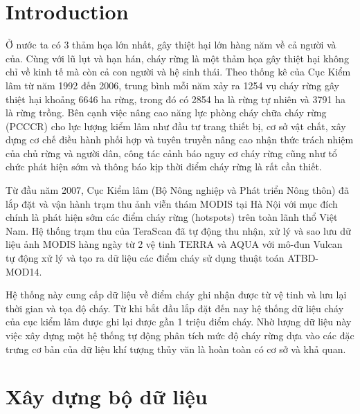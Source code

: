 \documentclass{article}
\begin{document}

\section{Introduction}

\qquad Ở nước ta có 3 thảm họa lớn nhất, gây thiệt hại lớn hàng năm về cả người và của. Cùng với lũ lụt và hạn hán, cháy rừng là một thảm họa gây thiệt hại không chỉ về kinh tế mà còn cả con người và hệ sinh thái. Theo thống kê của Cục Kiểm lâm từ năm 1992 đến 2006, trung bình mỗi năm xảy ra 1254 vụ cháy rừng gây thiệt hại khoảng 6646 ha rừng, trong đó có 2854 ha là rừng tự nhiên và 3791 ha là rừng trồng. Bên cạnh việc nâng cao năng lực phòng cháy chữa cháy rừng (PCCCR) cho lực lượng kiểm lâm như đầu tư trang thiết bị, cơ sở vật chất, xây dựng cơ chế điều hành phối hợp và tuyên truyền nâng cao nhận thức trách nhiệm của chủ rừng và người dân, công tác cảnh báo nguy cơ cháy rừng cũng như tổ chức phát hiện sớm và thông báo kịp thời điểm cháy rừng là rất cần thiết.

Từ đầu năm 2007, Cục Kiểm lâm (Bộ Nông nghiệp và Phát triển Nông thôn) đã lắp đặt và vận hành trạm thu ảnh viễn thám MODIS tại Hà Nội với mục đích chính là phát hiện sớm các điểm cháy rừng (hotspots) trên toàn lãnh thổ Việt Nam. Hệ thống trạm thu của TeraScan đã tự động thu nhận, xử lý và sao lưu dữ liệu ảnh MODIS hàng ngày từ 2 vệ tinh TERRA và AQUA với mô-đun Vulcan tự động xử lý và tạo ra dữ liệu các điểm cháy sử dụng thuật toán ATBD-MOD14.

Hệ thống này cung cấp dữ liệu về điểm cháy ghi nhận được từ vệ tinh và lưu lại thời gian và tọa độ cháy. Từ khi bắt đầu lắp đặt đến nay hệ thống dữ liệu cháy của cục kiểm lâm được ghi lại được gần 1 triệu điểm cháy. Nhờ lượng dữ liệu này việc xây dựng một hệ thống tự động phân tích mức độ cháy rừng dựa vào các đặc trưng cơ bản của dữ liệu khí tượng thủy văn là hoàn toàn có cơ sở và khả quan.


\section{Xây dựng bộ dữ liệu}
\end{document}
